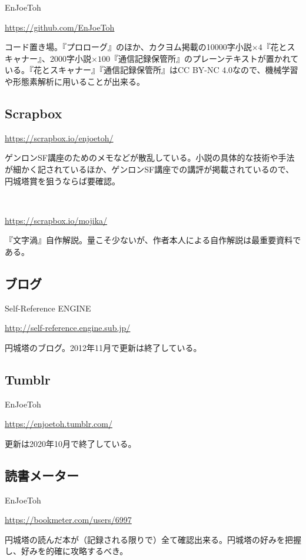 \documentclass[10pt, a5paper, twoside]{jsarticle}
\theoremstyle{definition}
\begin{document}
			EnJoeToh

			\url{https://github.com/EnJoeToh}

			コード置き場。『プロローグ』のほか、カクヨム掲載の10000字小説$\times 4$『花とスキャナー』、2000字小説$\times 100$『通信記録保管所』のプレーンテキストが置かれている。『花とスキャナー』『通信記録保管所』はCC BY-NC 4.0なので、機械学習や形態素解析に用いることが出来る。

		\subsection{Scrapbox}

			\url{https://scrapbox.io/enjoetoh/}

			ゲンロンSF講座のためのメモなどが散乱している。小説の具体的な技術や手法が細かく記されているほか、ゲンロンSF講座での講評が掲載されているので、円城塔賞を狙うならば要確認。

			~

			\url{https://scrapbox.io/mojika/}

			『文字渦』自作解説。量こそ少ないが、作者本人による自作解説は最重要資料である。

		\subsection{ブログ}

			Self-Reference ENGINE

			\url{http://self-reference.engine.sub.jp/}

			円城塔のブログ。2012年11月で更新は終了している。

		\subsection{Tumblr}

			EnJoeToh

			\url{https://enjoetoh.tumblr.com/}

			更新は2020年10月で終了している。

		\subsection{読書メーター}

			EnJoeToh

			\url{https://bookmeter.com/users/6997}

			円城塔の読んだ本が（記録される限りで）全て確認出来る。円城塔の好みを把握し、好みを的確に攻略するべき。
\end{document}
